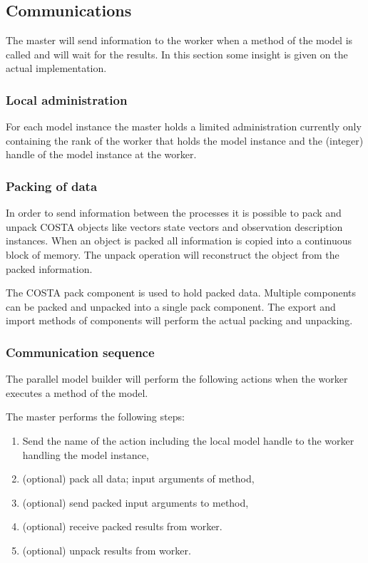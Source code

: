 \subsection{Communications}
The master will send information to the worker when a method of the model
is called and will wait for the results. In this section some insight is
given on the actual implementation.

\subsubsection{Local administration}
For each model instance the master holds a limited administration currently
only containing the rank of the worker that holds the model instance and
the (integer) handle of the model instance at the worker.

\subsubsection{Packing of data}
In order to send information between the processes it is possible to pack
and unpack COSTA objects like vectors state vectors and observation
description instances. 
When an object is packed all information is copied into a continuous block
of memory. The unpack operation will reconstruct the object from the packed
information.

The COSTA pack component is used to hold packed data. Multiple components
can be packed and unpacked into a single pack component. The export and
import methods of components will perform the actual packing and unpacking. 

\subsubsection{Communication sequence}
The parallel model builder will perform the following actions when the worker
executes a method of the model.

The master performs the following steps:
\begin{enumerate}
\item Send the name of the action including the local model handle to the
      worker handling the model instance,
\item (optional) pack all data; input arguments of method,
\item (optional) send packed input arguments to method,
\item (optional) receive packed results from worker.
\item (optional) unpack results from worker.
\end{enumerate}

